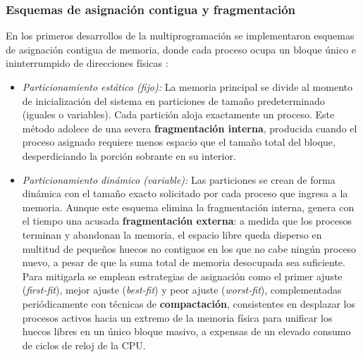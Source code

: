 \documentclass[12pt]{article}
\begin{document}
\subsubsection{Esquemas de asignación contigua y fragmentación}
En los primeros desarrollos de la multiprogramación se implementaron esquemas de asignación contigua de memoria, donde cada proceso ocupa un bloque único e ininterrumpido de direcciones físicas \parencite[\S 8.3, pp.\ 280--285]{silberschatz2006fundamentos}:
\begin{itemize}[leftmargin=*]
    \item \textit{Particionamiento estático (fijo):} La memoria principal se divide al momento de inicialización del sistema en particiones de tamaño predeterminado (iguales o variables). Cada partición aloja exactamente un proceso. Este método adolece de una severa \textbf{fragmentación interna}, producida cuando el proceso asignado requiere menos espacio que el tamaño total del bloque, desperdiciando la porción sobrante en su interior.
    \item \textit{Particionamiento dinámico (variable):} Las particiones se crean de forma dinámica con el tamaño exacto solicitado por cada proceso que ingresa a la memoria. Aunque este esquema elimina la fragmentación interna, genera con el tiempo una acusada \textbf{fragmentación externa}: a medida que los procesos terminan y abandonan la memoria, el espacio libre queda disperso en multitud de pequeños huecos no contiguos en los que no cabe ningún proceso nuevo, a pesar de que la suma total de memoria desocupada sea suficiente. Para mitigarla se emplean estrategias de asignación como el primer ajuste (\textit{first-fit}), mejor ajuste (\textit{best-fit}) y peor ajuste (\textit{worst-fit}), complementadas periódicamente con técnicas de \textbf{compactación}, consistentes en desplazar los procesos activos hacia un extremo de la memoria física para unificar los huecos libres en un único bloque masivo, a expensas de un elevado consumo de ciclos de reloj de la CPU.
\end{itemize}
\end{document}
